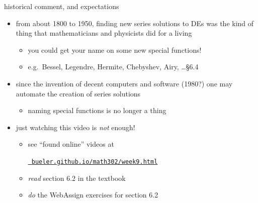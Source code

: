 \documentclass[urlcolor=blue,dvipsnames]{beamer}
\begin{document}
\begin{frame}{historical comment, and expectations}

\begin{itemize}
\item from about 1800 to 1950, finding new series solutions to DEs was the kind of thing that mathematicians and physicists did for a living
    \begin{itemize}
    \item you could get your name on some new special functions!
    \item e.g.~Bessel, Legendre, Hermite, Chebyshev, Airy, \dots \S 6.4
    \end{itemize}
\item since the invention of decent computers and software (1980?) one may automate the creation of series solutions
    \begin{itemize}
    \item naming special functions is no longer a thing
    \end{itemize}

\bigskip
\item just watching this video is \emph{not} enough!
     \begin{itemize}
     \item see ``found online'' videos at

     \centerline{\href{https://bueler.github.io/math302/week9.html}{\tt \color{cyan} bueler.github.io/math302/week9.html}}
     \item \emph{read} section 6.2 in the textbook
     \item \emph{do} the WebAssign exercises for section 6.2
     \end{itemize}
\end{itemize}
\end{frame}
\end{document}
